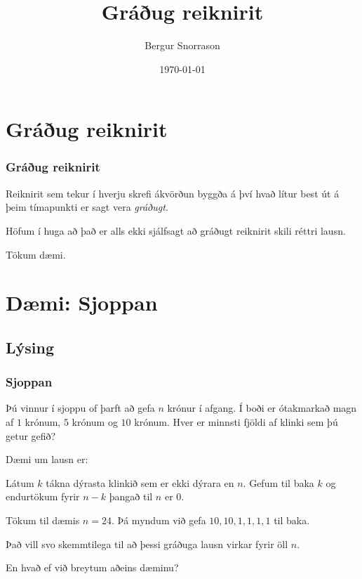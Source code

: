 \title{Gráðug reiknirit}
\author{Bergur Snorrason}
\date{\today}



\frame{\titlepage}

\section{Gráðug reiknirit}
{
    \frametitle{Gráðug reiknirit}
    {
        \item<1-> Reiknirit sem tekur í hverju skrefi ákvörðun byggða á því hvað lítur best út á þeim tímapunkti er sagt vera \emph{gráðugt}.
        \item<2-> Höfum í huga að það er alls ekki sjálfsagt að gráðugt reiknirit skili réttri lausn.
        \item<3-> Tökum dæmi.
    }
}

\section{Dæmi: Sjoppan}
\subsection{Lýsing}
{
    \frametitle{Sjoppan}
    {
        \item<1-> 
            Þú vinnur í sjoppu of þarft að gefa $n$ krónur í afgang. 
            Í boði er ótakmarkað magn af $1$ krónum, $5$ krónum og $10$ krónum.
            Hver er minnsti fjöldi af klinki sem þú getur gefið?
        \item<2-> Dæmi um lausn er:
        \item<3-> Látum $k$ tákna dýrasta klinkið sem er ekki dýrara en $n$. Gefum til baka $k$ og endurtökum fyrir $n - k$ þangað til $n$ er $0$.
        \item<4-> Tökum til dæmis $n = 24$. Þá myndum við gefa $10, 10, 1, 1, 1, 1$ til baka.
        \item<5-> Það vill svo skemmtilega til að þessi gráðuga lausn virkar fyrir öll $n$.
        \item<6-> En hvað ef við breytum aðeins dæminu?
    }
}

